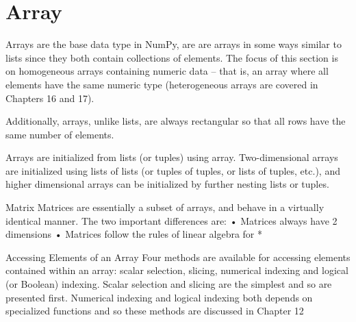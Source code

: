 \section*{Array}
Arrays are the base data type in NumPy, are are arrays in some ways similar to lists since they both contain
collections of elements. The focus of this section is on homogeneous arrays containing numeric data
– that is, an array where all elements have the same numeric type (heterogeneous arrays are covered in
Chapters 16 and 17). 

Additionally, arrays, unlike lists, are always rectangular so that all rows have the same
number of elements.

Arrays are initialized from lists (or tuples) using array. Two-dimensional arrays are initialized using
lists of lists (or tuples of tuples, or lists of tuples, etc.), and higher dimensional arrays can be initialized by
further nesting lists or tuples.

Matrix
Matrices are essentially a subset of arrays, and behave in a virtually identical manner. The two important
differences are:
• Matrices always have 2 dimensions
• Matrices follow the rules of linear algebra for *



Accessing Elements of an Array
Four methods are available for accessing elements contained within an array: scalar selection, slicing,
numerical indexing and logical (or Boolean) indexing. Scalar selection and slicing are the simplest and so
are presented first. Numerical indexing and logical indexing both depends on specialized functions and
so these methods are discussed in Chapter 12
